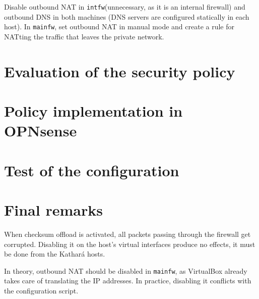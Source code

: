 \documentclass[draft]{homework}
\newcommand{\intfw}{\texttt{intfw}\xspace}
\newcommand{\kat}{Kathará\xspace}
\newcommand{\mainfw}{\texttt{mainfw}\xspace}
\newcommand{\opn}{OPNsense\xspace}
\newcommand{\vb}{VirtualBox\xspace}
\begin{document}
    Disable outbound NAT in \intfw (unnecessary, as it is an internal firewall) and outbound DNS in both machines (DNS servers are configured statically in each host). In \mainfw, set outbound NAT in manual mode and create a rule for NATting the traffic that leaves the private network.
    
    
    \section{Evaluation of the security policy}
    
    
    \section{Policy implementation in \opn}
    
    
    \section{Test of the configuration}
    
    
    \section{Final remarks}
    When checksum offload is activated, all packets passing through the firewall get corrupted. Disabling it on the host's virtual interfaces produce no effects, it must be done from the \kat hosts.
    
    In theory, outbound NAT should be disabled in \mainfw, as \vb already takes care of translating the IP addresses. In practice, disabling it conflicts with the configuration script.
\end{document}
